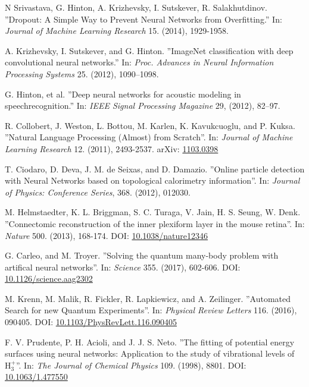 \documentclass[twoside,english]{uiofysmaster}
\begin{document}
\begin{thebibliography}{56}
 N Srivastava, G. Hinton, A. Krizhevsky, I. Sutskever, R. Salakhutdinov. 
 ''Dropout: A Simple Way to Prevent Neural Networks from Overfitting.''
 In: \textit{Journal of Machine Learning Research} 15. (2014), 1929-1958. 
 
 A. Krizhevsky, I. Sutskever, and G. Hinton.
 ''ImageNet classification with deep
 convolutional neural networks.'' 
 In: \textit{Proc. Advances in Neural Information Processing Systems} 25. (2012), 1090–1098.
 
 G. Hinton, et al. 
 ''Deep neural networks for acoustic modeling in speechrecognition.'' 
 In: \textit{IEEE Signal Processing Magazine} 29, (2012), 82–97.
 
 R. Collobert, J. Weston, L. Bottou, M. Karlen, K. Kavukcuoglu, and P. Kuksa. 
 ''Natural Language Processing (Almost) from Scratch''.
 In: \textit{Journal of Machine Learning Research} 12. (2011), 2493-2537. 
 arXiv: \href{https://arxiv.org/abs/1103.0398}{1103.0398}
 
 T. Ciodaro, D. Deva, J. M. de Seixas, and D. Damazio. 
 ''Online particle detection with Neural Networks based on topological calorimetry information''. 
 In: \textit{Journal of Physics: Conference Series}, 368. (2012), 012030. 
 
 M. Helmstaedter, K. L. Briggman, S. C. Turaga, V. Jain, H. S. Seung, W. Denk. 
 ''Connectomic reconstruction of the inner plexiform layer in the mouse retina''. 
 In: \textit{Nature} 500. (2013), 168-174. 
 DOI: \href{http://doi.org/10.1038/nature12346}{10.1038/nature12346}
 
 G. Carleo, and M. Troyer. 
 ''Solving the quantum many-body problem with artifical neural networks''. 
 In: \textit{Science} 355. (2017), 602-606. 
 DOI: \href{http://doi.org/10.1126/science.aag2302}{10.1126/science.aag2302}
 
 M. Krenn, M. Malik, R. Fickler, R. Lapkiewicz, and A. Zeilinger. 
 ''Automated Search for new Quantum Experiments''. 
 In: \textit{Physical Review Letters} 116. (2016), 090405. 
 DOI: \href{http://doi.org/10.1103/PhysRevLett.116.090405}{10.1103/PhysRevLett.116.090405}
 
 F. V. Prudente, P. H. Acioli, and J. J. S. Neto. 
 ''The fitting of potential energy surfaces using neural networks: Application to the study of 
 vibrational levels of $\mathrm{H}_3^+$''. 
 In: \textit{The Journal of Chemical Physics} 109. (1998), 8801. 
 DOI: \href{http://dx.doi.org/10.1063/1.477550}{10.1063/1.477550}
 
 
 
\end{thebibliography}
\end{document}
